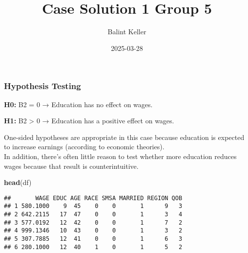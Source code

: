 \documentclass[
]{article}
\title{Case Solution 1 Group 5}
\author{Balint Keller}
\date{2025-03-28}
\newenvironment{Shaded}{\begin{snugshade}}{\end{snugshade}}
\newcommand{\FunctionTok}[1]{\textcolor[rgb]{0.13,0.29,0.53}{\textbf{#1}}}
\newcommand{\NormalTok}[1]{#1}
\begin{document}
\maketitle

\subsubsection{Hypothesis Testing}\label{hypothesis-testing}

\textbf{H0:} B2 = 0 → Education has no effect on wages.

\textbf{H1:} B2 \textgreater{} 0 → Education has a positive effect on
wages.

One-sided hypotheses are appropriate in this case because education is
expected to increase earnings (according to economic theories).\\
In addition, there's often little reason to test whether more education
reduces wages because that result is counterintuitive.

\begin{Shaded}
\begin{Highlighting}[]
\FunctionTok{head}\NormalTok{(df)}
\end{Highlighting}
\end{Shaded}

\begin{verbatim}
##       WAGE EDUC AGE RACE SMSA MARRIED REGION QOB
## 1 580.1000    9  45    0    0       1      9   3
## 2 642.2115   17  47    0    0       1      3   4
## 3 577.0192   12  42    0    0       1      7   2
## 4 999.1346   10  43    0    0       1      3   2
## 5 307.7885   12  41    0    0       1      6   3
## 6 280.1000   12  40    1    0       1      5   2
\end{verbatim}
\end{document}
